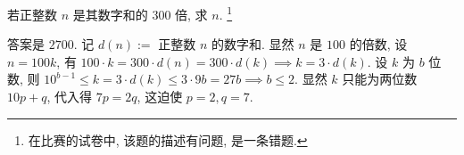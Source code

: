 \begin{prob}
\label{prob:prob-2}
若正整数 $n$ 是其数字和的 300 倍, 求 $n$.
\footnote{在比赛的试卷中, 该题的描述有问题, 是一条错题.}
\end{prob}

\begin{soln}
答案是 $\boxed{2700.}$ 记 $d(n) :=$ 正整数 $n$ 的数字和.
显然 $n$ 是 $100$ 的倍数, 设 $n = 100k$, 有
$100\cdot k = 300\cdot d(n) = 300\cdot d(k) \implies k = 3\cdot d(k)$.
设 $k$ 为 $b$ 位数, 则 $10^{b-1} \le k = 3\cdot d(k) \le 3\cdot 9b = 27b
\implies b \le 2$. 显然 $k$ 只能为两位数 $10p + q$,
代入得 $7p = 2q$, 这迫使 $p = 2, q = 7$.
\end{soln}

